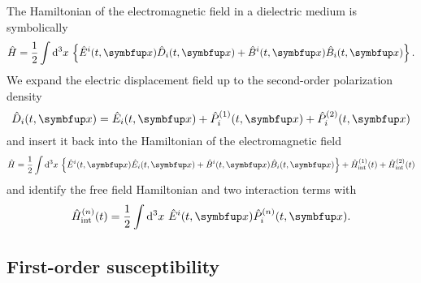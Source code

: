 The Hamiltonian of the electromagnetic field in a dielectric medium is symbolically~\cite[p.~124]{Jackson2007}
\begin{equation}
	\hat{H}
	=
	\frac{1}{2}
	\int\dd[3]{x}
	\left\{
		\hat{E}^i(t,\vb{x})
		\hat{D}_i(t,\vb{x})
		+
		\hat{B}^i(t,\vb{x})
		\hat{B}_i(t,\vb{x})
	\right\}
	.
\end{equation}
We expand the electric displacement field up to the second-order polarization density
\begin{equation}
	\hat{D}_i(t,\vb{x})
	=
	\hat{E}_i(t,\vb{x})
	+
	\hat{P}_i^{(1)}(t,\vb{x})
	+
	\hat{P}_i^{(2)}(t,\vb{x})
\end{equation}
and insert it back into the Hamiltonian of the electromagnetic field
\begin{equation}
	\hat{H}
	=
	\frac{1}{2}
	\int\dd[3]{x}
	\left\{
		\hat{E}^i(t,\vb{x})
		\hat{E}_i(t,\vb{x})
		+
		\hat{B}^i(t,\vb{x})
		\hat{B}_i(t,\vb{x})
	\right\}
	+
	\hat{H}_\text{int}^{(1)}(t)
	+
	\hat{H}_\text{int}^{(2)}(t)
\end{equation}
and identify the free field Hamiltonian and two interaction terms with
\begin{align}
	\hat{H}_\text{int}^{(n)}(t)
	=	
	\frac{1}{2}
	\int\dd[3]{x}
	\hat{E}^i(t,\vb{x})
	\hat{P}_i^{(n)}(t,\vb{x})
	.
\end{align}

\subsection{First-order susceptibility}


